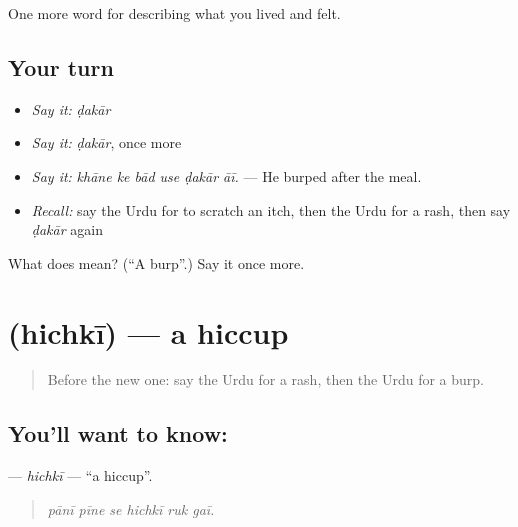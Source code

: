 \begin{grammarlens}[title={What you've built}]
One more word for describing what you lived and felt.
\end{grammarlens}

\subsection*{Your turn}
\begin{itemize}
\raggedright
  \item \emph{Say it:} \emph{ḍakār}
  \item \emph{Say it:} \emph{ḍakār}, once more
  \item \emph{Say it:} \emph{khāne ke bād use ḍakār āī.} — He burped after the meal.
  \item \emph{Recall:} say the Urdu for to scratch an itch, then the Urdu for a rash, then say \emph{ḍakār} again
\end{itemize}

\begin{tcolorbox}[breakable,colback=teal!4,colframe=teal!35!black,title={Before you move on}]
What does  mean? (\textquotedblleft{}A burp\textquotedblright{}.) Say it once more.
\end{tcolorbox}
\section[\texorpdfstring{\ur{ہچکی} (hichkī)}{ہچکی (hichkī)}]{ (hichkī) — a hiccup}

\label{lesson:UR-C469-hichki}



\begin{quote}
Before the new one: say the Urdu for a rash, then the Urdu for a burp.
\end{quote}

\subsection*{You'll want to know: }
\textbf{} — \emph{hichkī} — \textquotedblleft{}a hiccup\textquotedblright{}.

\begin{quote}
     
\end{quote}

\begin{quote}
\emph{pānī pīne se hichkī ruk gaī.}
\end{quote}

